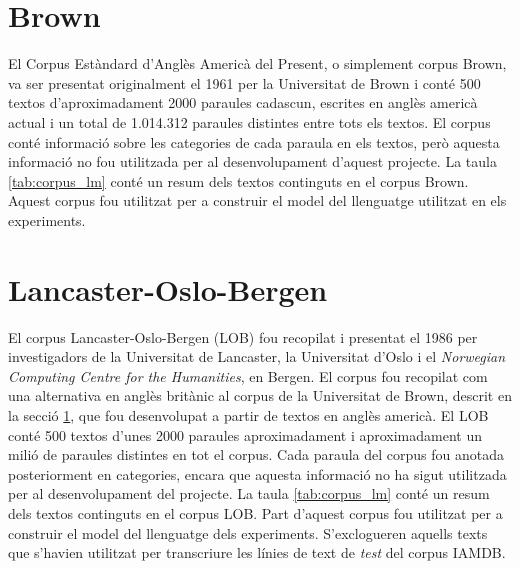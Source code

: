 \section{Brown}\label{sec:corpus_brown}
El Corpus Estàndard d'Anglès Americà del Present, o simplement corpus Brown, va ser presentat originalment el 1961\cite{francis1979brown} per la Universitat de Brown i conté 500 textos d'aproximadament 2000 paraules cadascun, escrites en anglès americà actual i un total de 1.014.312 paraules distintes entre tots els textos. El corpus conté informació sobre les categories de cada paraula en els textos, però aquesta informació no fou utilitzada per al desenvolupament d'aquest projecte. La taula \ref{tab:corpus_lm} conté un resum dels textos continguts en el corpus Brown. Aquest corpus fou utilitzat per a construir el model del llenguatge utilitzat en els experiments.

\section{Lancaster-Oslo-Bergen}\label{sec:corpus_lob}
El corpus Lancaster-Oslo-Bergen (LOB) fou recopilat i presentat el 1986\cite{johansson1986tagged} per investigadors de la Universitat de Lancaster, la Universitat d'Oslo i el \emph{Norwegian Computing Centre for the Humanities}, en Bergen. El corpus fou recopilat com una alternativa en anglès britànic al corpus de la Universitat de Brown, descrit en la secció \ref{sec:corpus_brown}, que fou desenvolupat a partir de textos en anglès americà. El LOB conté 500 textos d'unes 2000 paraules aproximadament i aproximadament un milió de paraules distintes en tot el corpus. Cada paraula del corpus fou anotada posteriorment en categories, encara que aquesta informació no ha sigut utilitzada per al desenvolupament del projecte. La taula \ref{tab:corpus_lm} conté un resum dels textos continguts en el corpus LOB. Part d'aquest corpus fou utilitzat per a construir el model del llenguatge dels experiments. S'exclogueren aquells texts que s'havien utilitzat per transcriure les línies de text de \emph{test} del corpus IAMDB.

